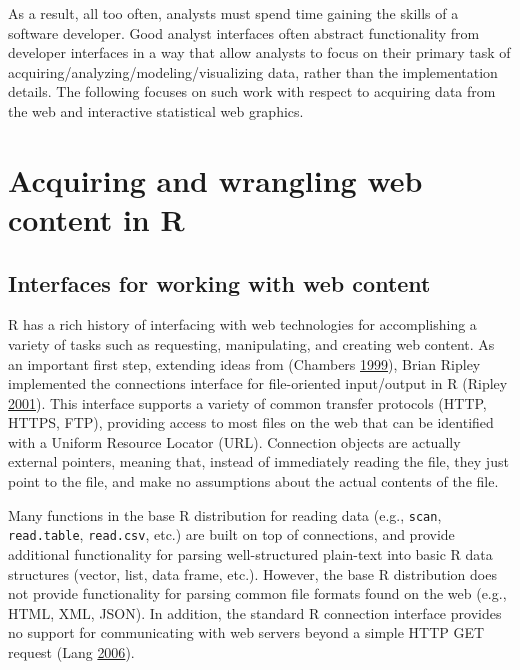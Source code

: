 \documentclass[12pt,]{isuthesis}
\begin{document}
As a result, all too often, analysts must spend time gaining the skills
of a software developer. Good analyst interfaces often abstract
functionality from developer interfaces in a way that allow analysts to
focus on their primary task of acquiring/analyzing/modeling/visualizing
data, rather than the implementation details. The following focuses on
such work with respect to acquiring data from the web and interactive
statistical web graphics.

\section{Acquiring and wrangling web content in
R}\label{acquiring-and-wrangling-web-content-in-r}

\subsection{Interfaces for working with web
content}\label{interfaces-for-working-with-web-content}

R has a rich history of interfacing with web technologies for
accomplishing a variety of tasks such as requesting, manipulating, and
creating web content. As an important first step, extending ideas from
(Chambers \protect\hyperlink{ref-Chambers:1999}{1999}), Brian Ripley
implemented the connections interface for file-oriented input/output in
R (Ripley \protect\hyperlink{ref-Connections}{2001}). This interface
supports a variety of common transfer protocols (HTTP, HTTPS, FTP),
providing access to most files on the web that can be identified with a
Uniform Resource Locator (URL). Connection objects are actually external
pointers, meaning that, instead of immediately reading the file, they
just point to the file, and make no assumptions about the actual
contents of the file.

Many functions in the base R distribution for reading data (e.g.,
\texttt{scan}, \texttt{read.table}, \texttt{read.csv}, etc.) are built
on top of connections, and provide additional functionality for parsing
well-structured plain-text into basic R data structures (vector, list,
data frame, etc.). However, the base R distribution does not provide
functionality for parsing common file formats found on the web (e.g.,
HTML, XML, JSON). In addition, the standard R connection interface
provides no support for communicating with web servers beyond a simple
HTTP GET request (Lang \protect\hyperlink{ref-Lang:2006us}{2006}).
\end{document}
